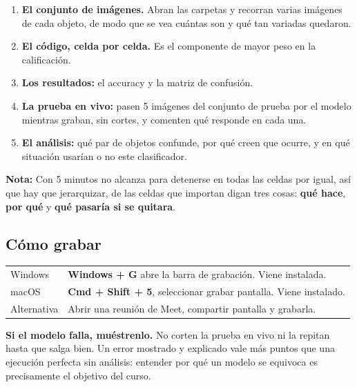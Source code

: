 \documentclass[11pt,a4paper]{article}
\begin{document}
\begin{enumerate}
  \item \textbf{El conjunto de imágenes.} Abran las carpetas y recorran varias imágenes de cada objeto, de modo que se vea cuántas son y qué tan variadas quedaron. 
  \item \textbf{El código, celda por celda.} Es el componente de mayor peso en la calificación.
  \item \textbf{Los resultados:} el accuracy y la matriz de confusión.
  \item \textbf{La prueba en vivo:} pasen 5 imágenes del conjunto de prueba por el modelo mientras graban, sin cortes, y comenten qué responde en cada una.
  \item \textbf{El análisis:} qué par de objetos confunde, por qué creen que ocurre, y en qué situación usarían o no este clasificador.
\end{enumerate}

\begin{tcolorbox}[colback=black!4,colframe=black!45,boxrule=0.6pt]
\noindent \textbf{Nota:}  Con 5 minutos no alcanza para detenerse en todas las celdas por igual, así que hay que jerarquizar, de las celdas que importan digan tres cosas: \textbf{qué hace}, \textbf{por qué} y \textbf{qué pasaría si se quitara}. 
\end{tcolorbox}

\subsection{Cómo grabar}

\begin{tabular}{L{3.2cm} L{11cm}}
\toprule
Windows & \textbf{Windows + G} abre la barra de grabación. Viene instalada. \\
macOS & \textbf{Cmd + Shift + 5}, seleccionar grabar pantalla. Viene instalado. \\
Alternativa & Abrir una reunión de Meet, compartir pantalla y grabarla. \\
\bottomrule
\end{tabular}

\begin{tcolorbox}[colback=black!4,colframe=black!45,boxrule=0.6pt]
\textbf{Si el modelo falla, muéstrenlo.} No corten la prueba en vivo ni la repitan hasta que
salga bien. Un error mostrado y explicado vale más puntos que una ejecución perfecta sin análisis:
entender por qué un modelo se equivoca es precisamente el objetivo del curso.
\end{tcolorbox}
\end{document}
